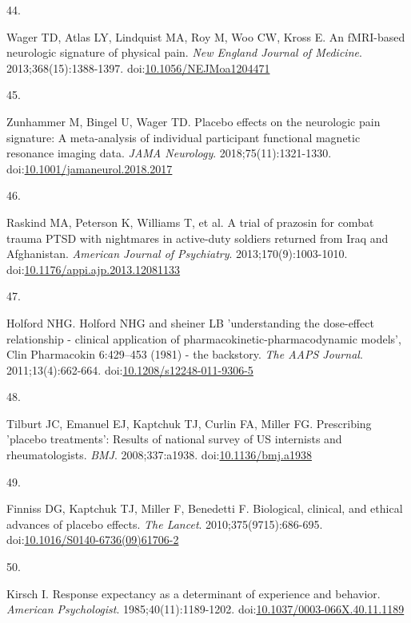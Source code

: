 \documentclass[
  11pt,
]{article}
\newlength{\cslhangindent}
\newlength{\csllabelwidth}
\newenvironment{CSLReferences}[2] %
 {\begin{list}{}{%
  \setlength{\itemindent}{0pt}
  \setlength{\leftmargin}{0pt}
  \setlength{\parsep}{0pt}
  \ifodd #1
   \setlength{\leftmargin}{\cslhangindent}
   \setlength{\itemindent}{-1\cslhangindent}
  \fi
  \setlength{\itemsep}{#2\baselineskip}}}
 {\end{list}}
\newcommand{\CSLLeftMargin}[1]{\parbox[t]{\csllabelwidth}{\strut#1\strut}}
\newcommand{\CSLRightInline}[1]{\parbox[t]{\linewidth - \csllabelwidth}{\strut#1\strut}}
\begin{document}
\begin{CSLReferences}{0}{1}
\CSLLeftMargin{44. }%
\CSLRightInline{Wager TD, Atlas LY, Lindquist MA, Roy M, Woo CW, Kross E. An {fMRI}-based neurologic signature of physical pain. \emph{New England Journal of Medicine}. 2013;368(15):1388-1397. doi:\href{https://doi.org/10.1056/NEJMoa1204471}{10.1056/NEJMoa1204471}}

\CSLLeftMargin{45. }%
\CSLRightInline{Zunhammer M, Bingel U, Wager TD. Placebo effects on the neurologic pain signature: A meta-analysis of individual participant functional magnetic resonance imaging data. \emph{JAMA Neurology}. 2018;75(11):1321-1330. doi:\href{https://doi.org/10.1001/jamaneurol.2018.2017}{10.1001/jamaneurol.2018.2017}}

\CSLLeftMargin{46. }%
\CSLRightInline{{Raskind MA, Peterson K, Williams T, et al.} A trial of prazosin for combat trauma {PTSD} with nightmares in active-duty soldiers returned from {I}raq and {A}fghanistan. \emph{American Journal of Psychiatry}. 2013;170(9):1003-1010. doi:\href{https://doi.org/10.1176/appi.ajp.2013.12081133}{10.1176/appi.ajp.2013.12081133}}

\CSLLeftMargin{47. }%
\CSLRightInline{Holford NHG. Holford {NHG} and sheiner {LB} 'understanding the dose-effect relationship - clinical application of pharmacokinetic-pharmacodynamic models', {Clin Pharmacokin} 6:429--453 (1981) - the backstory. \emph{The AAPS Journal}. 2011;13(4):662-664. doi:\href{https://doi.org/10.1208/s12248-011-9306-5}{10.1208/s12248-011-9306-5}}

\CSLLeftMargin{48. }%
\CSLRightInline{Tilburt JC, Emanuel EJ, Kaptchuk TJ, Curlin FA, Miller FG. Prescribing 'placebo treatments': Results of national survey of {US} internists and rheumatologists. \emph{BMJ}. 2008;337:a1938. doi:\href{https://doi.org/10.1136/bmj.a1938}{10.1136/bmj.a1938}}

\CSLLeftMargin{49. }%
\CSLRightInline{Finniss DG, Kaptchuk TJ, Miller F, Benedetti F. Biological, clinical, and ethical advances of placebo effects. \emph{The Lancet}. 2010;375(9715):686-695. doi:\href{https://doi.org/10.1016/S0140-6736(09)61706-2}{10.1016/S0140-6736(09)61706-2}}

\CSLLeftMargin{50. }%
\CSLRightInline{Kirsch I. Response expectancy as a determinant of experience and behavior. \emph{American Psychologist}. 1985;40(11):1189-1202. doi:\href{https://doi.org/10.1037/0003-066X.40.11.1189}{10.1037/0003-066X.40.11.1189}}


\end{CSLReferences}
\end{document}
